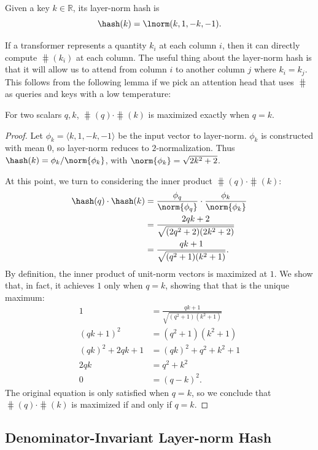 \begin{definition}
    Given a key $k \in \mathbb R$, its layer-norm hash is
    \begin{equation*}
        \hash(k) = \lnorm(k, 1, -k, -1) .
    \end{equation*}
\end{definition}

If a transformer represents a quantity $k_i$ at each column $i$, then it can directly compute $\hash(k_i)$ at each column. The useful thing about the layer-norm hash is that it will allow us to attend from column $i$ to another column $j$ where $k_i = k_j$. This follows from the following lemma if we pick an attention head that uses $\hash$ as queries and keys with a low temperature:

\begin{lemma} \label{lem:lnorm-hash}
    For two scalars $q, k$, $\hash(q) \cdot \hash(k)$ is maximized exactly when $q = k$.
\end{lemma}

\begin{proof}
    Let $\phi_k = \langle k, 1, -k, -1\rangle$ be the input vector to layer-norm.
    $\phi_k$ is constructed with mean $0$, so layer-norm reduces to $2$-normalization. Thus $\hash(k) = \phi_k / \norm{\phi_k}$, with $\norm{\phi_k} = \sqrt{2k^2 + 2}$.

    At this point, we turn to considering the inner product $\hash(q) \cdot \hash(k)$:
    \begin{align*}
        \hash(q) \cdot \hash(k)
        &= \frac{\phi_q}{\norm{\phi_q}} \cdot \frac{\phi_k}{\norm{\phi_k}} \\
        &= \frac{2qk + 2}{\sqrt{(2q^2 + 2)(2k^2 + 2)}} \\
        &= \frac{qk + 1}{\sqrt{(q^2 + 1)(k^2 + 1)}} .
    \end{align*}
    By definition, the inner product of unit-norm vectors is maximized at $1$.
    We show that, in fact, it achieves $1$ only when $q = k$, showing that that is the unique maximum:
    \begin{align*}
        1 &= \frac{qk + 1}{\sqrt{(q^2 + 1)(k^2 + 1)}} \\
        (qk + 1)^2 &= (q^2 + 1)(k^2 + 1) \\
        (qk)^2 + 2qk + 1 &= (qk)^2 + q^2 + k^2 + 1 \\
        2qk &= q^2 + k^2 \\
        0 &= (q - k)^2 .
    \end{align*}
    The original equation is only satisfied when $q = k$, so we conclude that $\hash(q) \cdot \hash(k)$ is maximized if and only if $q = k$.
\end{proof}

\subsection{Denominator-Invariant Layer-norm Hash}
